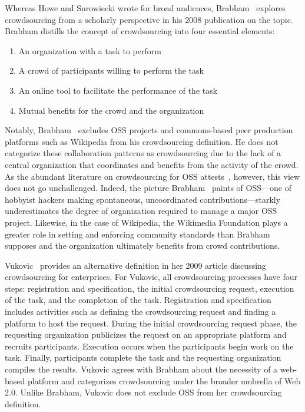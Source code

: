 Whereas Howe and Surowiecki wrote for broad audiences, Brabham~\cite{brabham, brabham2} explores crowdsourcing from a scholarly perspective in his 2008 publication on the topic. Brabham distills the concept of crowdsourcing into four essential elements: 
\begin{enumerate}
    \item An organization with a task to perform
    \item A crowd of participants willing to perform the task
    \item An online tool to facilitate the performance of the task
    \item Mutual benefits for the crowd and the organization
\end{enumerate}
Notably, Brabham~\cite{brabham} excludes OSS projects and commons-based peer production platforms such as Wikipedia from his crowdsourcing definition. He does not categorize these collaboration patterns as crowdsourcing due to the lack of a central organization that coordinates and benefits from the activity of the crowd. As the abundant literature on crowdsourcing for OSS attests~\cite{glinz}, however, this view does not go unchallenged. Indeed, the picture Brabham~\cite{brabham} paints of OSS---one of hobbyist hackers making spontaneous, uncoordinated contributions---starkly underestimates the degree of organization required to manage a major OSS project. Likewise, in the case of Wikipedia, the Wikimedia Foundation plays a greater role in setting and enforcing community standards than Brabham supposes and the organization ultimately benefits from crowd contributions.

Vukovic~\cite{vukovic} provides an alternative definition in her 2009 article discussing crowdsourcing for enterprises. For Vukovic, all crowdsourcing processes have four steps: registration and specification, the initial crowdsourcing request, execution of the task, and the completion of the task. Registration and specification includes activities such as defining the crowdsourcing request and finding a platform to host the request. During the initial crowdsourcing request phase, the requesting organization publicizes the request on an appropriate platform and recruits participants. Execution occurs when the participants begin work on the task. Finally, participants complete the task and the requesting organization compiles the results. Vukovic agrees with Brabham about the necessity of a web-based platform and categorizes crowdsourcing under the broader umbrella of Web 2.0. Unlike Brabham, Vukovic does not exclude OSS from her crowdsourcing definition.

